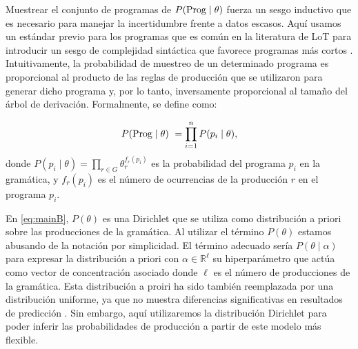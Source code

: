 Muestrear el conjunto de programas de $P({\rm Prog} \mid \theta)$ fuerza un sesgo inductivo que es necesario para manejar la incertidumbre frente a datos escasos. Aquí usamos un estándar previo para los programas que es común en la literatura de LoT para introducir un sesgo de complejidad sintáctica que favorece programas más cortos \cite{goodman2008rational,overlan2017learning}. Intuitivamente, la probabilidad de muestreo de un determinado programa es proporcional al producto de las reglas de producción que se utilizaron para generar dicho programa y, por lo tanto, inversamente proporcional al tamaño del árbol de derivación. Formalmente, se define como:

%
\begin{equation}
\label{eqC}
P({\rm Prog} \mid \theta)\ = \prod\limits_{i = 1}^n P(p_i \mid \theta),
\end{equation}
%
donde $P(p_i \mid \theta) = \prod\limits_{r \in G} \theta^{f_r(p_i)}_{r}$ es la probabilidad del programa $p_i$ en la gramática, y $f_r(p_i)$ es el número de ocurrencias de la producción $r$ en el programa $p_i$.


En \eqref{eq:mainB}, $P(\theta)$ es una Dirichlet que se utiliza como distribución a priori sobre las producciones de la gramática. Al utilizar el término $P(\theta)$ estamos abusando de la notación por simplicidad. El término adecuado sería $P(\theta \mid \alpha)$ para expresar la distribución a priori con $\alpha \in \mathbb{R}^\ell$ su hiperparámetro que actúa como vector de concentración asociado donde $\ell$ es el número de producciones de la gramática. Esta distribución a proiri ha sido también reemplazada por una distribución uniforme, ya que no muestra diferencias significativas en resultados de predicción \cite{piantadosi2012bootstrapping,yildirim2015learning}. Sin embargo, aquí utilizaremos la distribución Dirichlet para poder inferir las probabilidades de producción a partir de este modelo más flexible.

